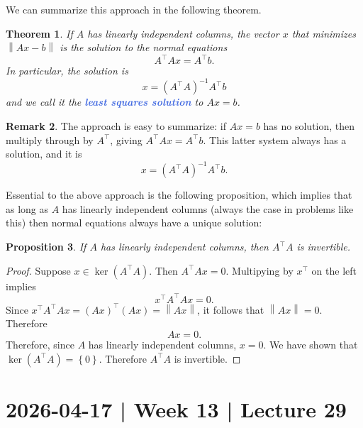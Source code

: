 \documentclass[10pt]{article}
\newtheorem{theorem}{Theorem}
\newtheorem{proposition}[theorem]{Proposition}
\theoremstyle{definition}
\newtheorem{remark}[theorem]{Remark}
\newcommand{\norm}[1]{\left\lVert#1\right\rVert} %
\newcommand{\1}[1]{\textbf{1}_{\left[#1\right]}} %
\newcommand{\demph}[1]{\textcolor{RoyalBlue}{\textbf{\slshape #1}}} %
\begin{document}
We can summarize this approach in the following theorem.
\begin{theorem}
  If $A$ has linearly independent columns, the vector $x$ that minimizes
  $\norm{Ax-b}$ is the solution to the normal equations
  \begin{equation*}
    A^{\top}Ax=A^{\top}b.
  \end{equation*}
  In particular, the solution is
  \begin{equation*}
    x=(A^{\top}A)^{-1}A^{\top}b
  \end{equation*}
  and we call it the \demph{least squares solution} to $Ax=b$.
\end{theorem}

\begin{remark}
  The approach is easy to summarize: if $Ax=b$ has no solution, then multiply
  through by $A^{\top}$,  giving $A^{\top}Ax=A^{\top}b$. This latter system
  always has a solution, and it is
  \begin{equation*}
    x=(A^{\top}A)^{-1}A^{\top}b.
  \end{equation*}
\end{remark}

Essential to the above approach is the following proposition, which implies
that as long as $A$ has linearly independent columns (always the case in
problems like this) then normal equations always have a unique solution:

\begin{proposition}
  If $A$ has linearly independent columns, then $A^{\top}A$ is invertible.
\end{proposition}
\begin{proof}
  Suppose $x\in \ker(A^{\top}A)$. Then $A^{\top}Ax=0$. Multipying by
  $x^{\top}$ on the left implies
  \begin{equation*}
    x^{\top}A^{\top}Ax=0.
  \end{equation*}
  Since $x^{\top}A^{\top}Ax=(Ax)^{\top}(Ax)=\norm{Ax}$, it follows that
  $\norm{Ax}=0$. Therefore
  \begin{equation*}
    Ax=0.
  \end{equation*}
  Therefore, since $A$ has linearly independent columns, $x=0$. We have shown
  that $\ker(A^{\top}A)=\left\{0\right\}$. Therefore $A^{\top}A$ is
  invertible.
\end{proof}

\newpage
\section{2026-04-17 | Week 13 | Lecture 29}
\end{document}
